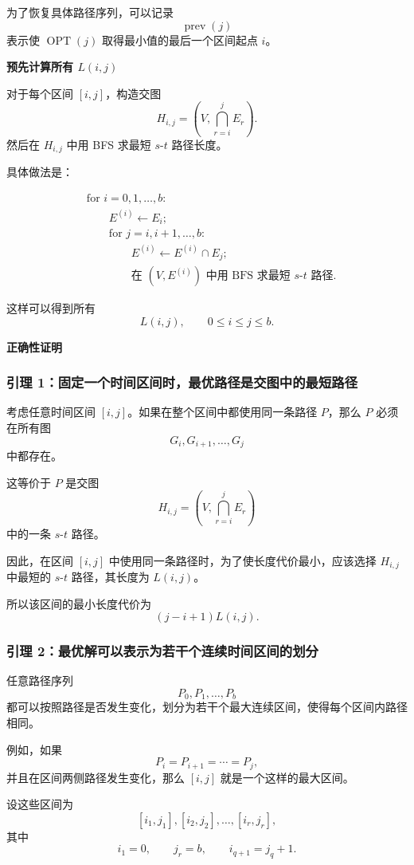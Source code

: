 \documentclass[12pt,a4paper]{article}
\begin{document}
\begin{answerbox}
为了恢复具体路径序列，可以记录
\[
\operatorname{prev}(j)
\]
表示使 $\operatorname{OPT}(j)$ 取得最小值的最后一个区间起点 $i$。

\textbf{预先计算所有 $L(i,j)$}

对于每个区间 $[i,j]$，构造交图
\[
H_{i,j}=\left(V,\bigcap_{r=i}^{j}E_r\right).
\]
然后在 $H_{i,j}$ 中用 BFS 求最短 $s$-$t$ 路径长度。

具体做法是：

\[
\begin{aligned}
&\text{for } i=0,1,\ldots,b: \\
&\qquad E^{(i)}\gets E_i;\\
&\qquad \text{for } j=i,i+1,\ldots,b: \\
&\qquad\qquad E^{(i)}\gets E^{(i)}\cap E_j;\\
&\qquad\qquad \text{在 } (V,E^{(i)}) \text{ 中用 BFS 求最短 } s\text{-}t \text{ 路径}.
\end{aligned}
\]

这样可以得到所有
\[
L(i,j),\qquad 0\le i\le j\le b.
\]

\textbf{正确性证明}

\subsubsection*{引理 1：固定一个时间区间时，最优路径是交图中的最短路径}

考虑任意时间区间 $[i,j]$。如果在整个区间中都使用同一条路径 $P$，那么 $P$ 必须在所有图
\[
G_i,G_{i+1},\ldots,G_j
\]
中都存在。

这等价于 $P$ 是交图
\[
H_{i,j}=\left(V,\bigcap_{r=i}^{j}E_r\right)
\]
中的一条 $s$-$t$ 路径。

因此，在区间 $[i,j]$ 中使用同一条路径时，为了使长度代价最小，应该选择 $H_{i,j}$ 中最短的 $s$-$t$ 路径，其长度为 $L(i,j)$。

所以该区间的最小长度代价为
\[
(j-i+1)L(i,j).
\]

\subsubsection*{引理 2：最优解可以表示为若干个连续时间区间的划分}

任意路径序列
\[
P_0,P_1,\ldots,P_b
\]
都可以按照路径是否发生变化，划分为若干个最大连续区间，使得每个区间内路径相同。

例如，如果
\[
P_i=P_{i+1}=\cdots=P_j,
\]
并且在区间两侧路径发生变化，那么 $[i,j]$ 就是一个这样的最大区间。

设这些区间为
\[
[i_1,j_1],[i_2,j_2],\ldots,[i_r,j_r],
\]
其中
\[
i_1=0,\qquad j_r=b,\qquad i_{q+1}=j_q+1.
\]


\end{answerbox}
\end{document}
